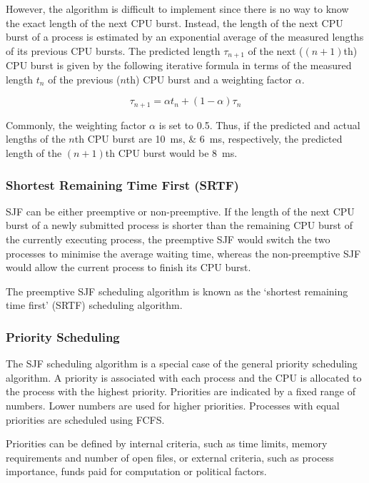 However, the algorithm is difficult to implement since there is no way to know the exact length of the next CPU burst.
Instead, the length of the next CPU burst of a process is estimated by an exponential average of the measured lengths of its previous CPU bursts.
The predicted length \( \tau_{n + 1} \) of the next (\( \left( n + 1 \right) \)th) CPU burst is given by the following iterative formula in terms of the measured length \( t_n \) of the previous (\( n \)th) CPU burst and a weighting factor \( \alpha \).

\begin{equation*}
  \tau_{n + 1} = \alpha t_n + \left( 1 - \alpha \right) \tau_n
\end{equation*}

Commonly, the weighting factor \( \alpha \) is set to \num{0.5}.
Thus, if the predicted and actual lengths of the \( n \)th CPU burst are \SIlist{10;6}{\milli\second}, respectively, the predicted length of the \( \left( n + 1 \right) \)th CPU burst would be \SI{8}{\milli\second}.

\subsubsection{Shortest Remaining Time First (SRTF)}

SJF can be either preemptive or non-preemptive.
If the length of the next CPU burst of a newly submitted process is shorter than the remaining CPU burst of the currently executing process, the preemptive SJF would switch the two processes to minimise the average waiting time, whereas the non-preemptive SJF would allow the current process to finish its CPU burst.

The preemptive SJF scheduling algorithm is known as the `shortest remaining time first' (SRTF) scheduling algorithm.

\subsubsection{Priority Scheduling}

The SJF scheduling algorithm is a special case of the general priority scheduling algorithm.
A priority is associated with each process and the CPU is allocated to the process with the highest priority.
Priorities are indicated by a fixed range of numbers.
Lower numbers are used for higher priorities.
Processes with equal priorities are scheduled using FCFS.

Priorities can be defined by internal criteria, such as time limits, memory requirements and number of open files, or external criteria, such as process importance, funds paid for computation or political factors.

